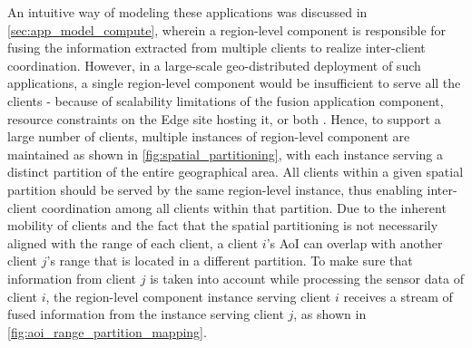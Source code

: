 An intuitive way of modeling these applications was discussed in \cref{sec:app_model_compute}, wherein a region-level component is responsible for fusing the information extracted from multiple clients to realize inter-client coordination. However, in a large-scale geo-distributed deployment of such applications, a single region-level component would be insufficient to serve all the clients - because of scalability limitations of the fusion application component, resource constraints on the Edge site hosting it, or both \cite{talkycars}. Hence, to support a large number of clients, multiple instances of region-level component are maintained as shown in \cref{fig:spatial_partitioning}, with each instance serving a distinct partition of the entire geographical area. All clients within a given spatial partition should be served by the same region-level instance, thus enabling inter-client coordination among all clients within that partition. Due to the inherent mobility of clients and the fact that the spatial partitioning is not necessarily aligned with the range of each client, a client $i$'s AoI can overlap with another client $j$'s range that is located in a different partition. To make sure that information from client $j$ is taken into account while processing the sensor data of client $i$, the region-level component instance serving client $i$ receives a stream of fused information from the instance serving client $j$, as shown in \cref{fig:aoi_range_partition_mapping}. 

